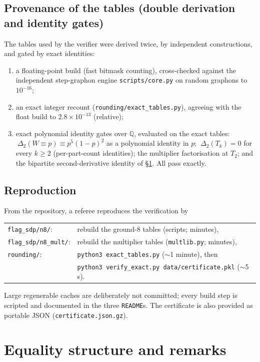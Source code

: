 \documentclass[11pt]{article}
\theoremstyle{definition}
\newcommand{\Q}{\mathbb Q}
\begin{document}
\subsection{Provenance of the tables (double derivation and identity gates)}

The tables used by the verifier were derived twice, by independent
constructions, and gated by exact identities:
\begin{enumerate}[leftmargin=1.6em]
\item a floating-point build (fast bitmask counting), cross-checked against the
independent step-graphon engine \texttt{scripts/core.py} on random graphons to
$10^{-16}$;
\item an exact integer recount (\texttt{rounding/exact\_tables.py}), agreeing
with the float build to $2.8\times10^{-13}$ (relative);
\item exact polynomial identity gates over $\Q$, evaluated on the exact
tables: $\ \Delta_2(W{\equiv}p)\equiv p^5(1-p)^2$ as a polynomial identity in
$p$; $\ \Delta_2(T_k)=0$ for every $k\ge2$ (per-part-count identities);
the multiplier factorisation at $T_2$; and the bipartite second-derivative
identity of \S\ref{sec:equality}.  All pass exactly.
\end{enumerate}

\subsection{Reproduction}

From the repository, a referee reproduces the verification by
\begin{center}
\begin{tabular}{ll}
\texttt{flag\_sdp/n8/}: & rebuild the ground-8 tables (scripts; minutes), \\
\texttt{flag\_sdp/n8\_mult/}: & rebuild the multiplier tables
(\texttt{multlib.py}; minutes), \\
\texttt{rounding/}: & \texttt{python3 exact\_tables.py} ($\sim$1 minute), then\\
& \texttt{python3 verify\_exact.py data/certificate.pkl} ($\sim$5 s).
\end{tabular}
\end{center}
Large regenerable caches are deliberately not committed; every build step is
scripted and documented in the three \texttt{README}s.  The certificate is
also provided as portable JSON (\texttt{certificate.json.gz}).

\section{Equality structure and remarks}\label{sec:equality}
\end{document}
